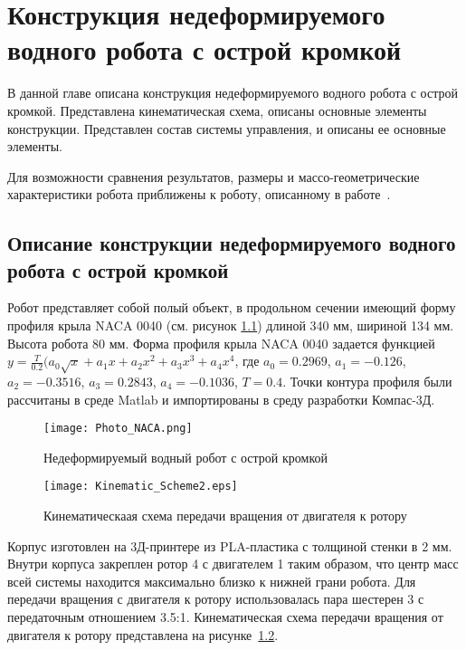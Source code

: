 \chapter{Конструкция недеформируемого водного робота с острой кромкой}\label{ch:ch5}

В данной главе описана конструкция недеформируемого водного робота с острой кромкой. Представлена кинематическая схема, описаны основные элементы конструкции. Представлен состав системы управления, и описаны ее основные элементы.

Для возможности сравнения результатов, размеры и массо-геометрические характеристики робота приближены к роботу, описанному в работе~\cite{Pollard_Tallapragada_2016}.

\section{Описание конструкции недеформируемого водного робота с острой кромкой}

Робот представляет собой полый объект, в продольном сечении имеющий форму профиля крыла NACA 0040 (см. рисунок \ref{Photo_NACA}) длиной 340 мм, шириной 134 мм. Высота робота 80 мм. Форма профиля крыла NACA 0040 задается функцией 
$ y = \frac{T}{0.2}(a_0\sqrt{x} + a_1x + a_2x^2 + a_3x^3 + a_4x^4 $, где $a_0=0.2969$, $a_1=-0.126$, $a_2=-0.3516$, $a_3=0.2843$, $a_4=-0.1036$, $T=0.4$. Точки контура профиля были рассчитаны в среде Matlab и импортированы в среду разработки Компас-3Д.	

\begin{figure}[h]
	\centering
	\texttt{[image: Photo\_NACA.png]}%
	\caption{Недеформируемый водный робот с острой кромкой}
	\label{Photo_NACA}
\end{figure}

\begin{figure}[h]
	\centering
	\texttt{[image: Kinematic\_Scheme2.eps]}%
	\caption{Кинематическаая схема передачи вращения от двигателя к ротору}
	\label{kinemSchemeNACA}
\end{figure}

Корпус изготовлен на 3Д-принтере из PLA-пластика с толщиной стенки в 2 мм. Внутри корпуса закреплен ротор 4 с двигателем 1 таким образом, что центр масс всей системы находится максимально близко к нижней грани робота. Для передачи вращения с двигателя к ротору использовалась пара шестерен 3 с передаточным отношением 3.5:1. Кинематическая схема передачи вращения от двигателя к ротору представлена на рисунке~\ref{kinemSchemeNACA}.



